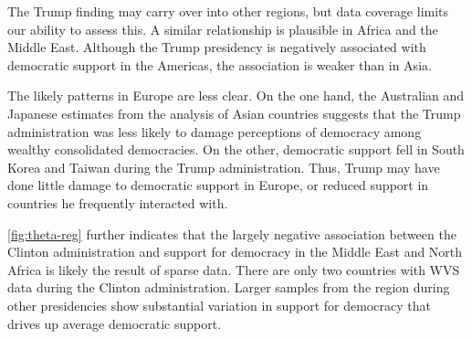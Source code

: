 \documentclass[12pt]{article}
\begin{document}
The Trump finding may carry over into other regions, but data coverage limits our ability to assess this. 
A similar relationship is plausible in Africa and the Middle East. 
Although the Trump presidency is negatively associated with democratic support in the Americas, the association is weaker than in Asia. 


The likely patterns in Europe are less clear. 
On the one hand, the Australian and Japanese estimates from the analysis of Asian countries suggests that the Trump administration was less likely to damage perceptions of democracy among wealthy consolidated democracies.
On the other, democratic support fell in South Korea and Taiwan during the Trump administration.
Thus, Trump may have done little damage to democratic support in Europe, or reduced support in countries he frequently interacted with. 


\autoref{fig:theta-reg} further indicates that the largely negative association between the Clinton administration and support for democracy in the Middle East and North Africa is likely the result of sparse data. 
There are only two countries with WVS data during the Clinton administration. 
Larger samples from the region during other presidencies show substantial variation in support for democracy that drives up average democratic support. 


%
%


  
 
 
\end{document}
